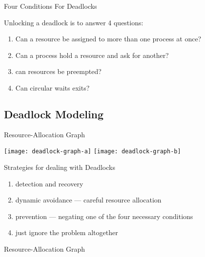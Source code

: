 \begin{frame}{Four Conditions For Deadlocks}
  \begin{block}{Unlocking a deadlock is to answer 4 questions:}
  \begin{enumerate}
  \item Can a resource be assigned to more than one process at once?
  \item Can a process hold a resource and ask for another?
  \item can resources be preempted?
  \item Can circular waits exits?
  \end{enumerate}    
  \end{block}
\end{frame}

\subsection{Deadlock Modeling}
\label{sec:deadlock-modeling}

\begin{frame}{Resource-Allocation Graph}
  \begin{center}
    \texttt{[image: deadlock-graph-a]}\qquad
    \texttt{[image: deadlock-graph-b]}
  \end{center}
  \begin{block}{Strategies for dealing with Deadlocks}
    \begin{enumerate}
    \item detection and recovery
    \item dynamic avoidance --- careful resource allocation
    \item prevention --- negating one of the four necessary conditions
    \item just ignore the problem altogether
    \end{enumerate}
  \end{block}
\end{frame}

\begin{frame}{Resource-Allocation Graph}
  \begin{minipage}{.49\linewidth}
    \begin{center}
    \end{center}
  \end{minipage}\hfill
  \begin{minipage}{.49\linewidth}
    \begin{center}
    \end{center}
  \end{minipage}
\end{frame}

